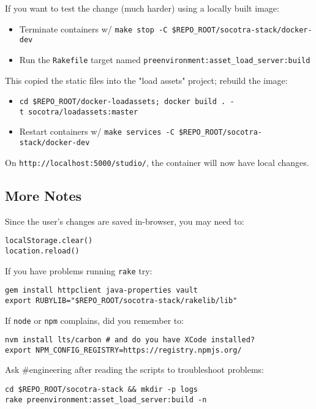 If you want to test the change (much harder) using a locally built
image:

\begin{itemize}
\tightlist
\item
  Terminate containers w/
  \texttt{make\ stop\ -C\ \$REPO\_ROOT/socotra-stack/docker-dev}
\item
  Run the \texttt{Rakefile} target named
  \texttt{preenvironment:asset\_load\_server:build}
\end{itemize}

This copied the static files into the "load assets" project; rebuild the
image:

\begin{itemize}
\tightlist
\item
  \texttt{cd\ \$REPO\_ROOT/docker-loadassets;\ docker\ build\ .\ -t\ socotra/loadassets:master}
\item
  Restart containers w/
  \texttt{make\ services\ -C\ \$REPO\_ROOT/socotra-stack/docker-dev}
\end{itemize}

On \texttt{http://localhost:5000/studio/}, the container will now have
local changes.

\hypertarget{more-notes}{%
\subsection{More Notes}\label{more-notes}}

Since the user's changes are saved in-browser, you may need to:

\begin{verbatim}
localStorage.clear()
location.reload()
\end{verbatim}

If you have problems running \texttt{rake} try:

\begin{verbatim}
gem install httpclient java-properties vault
export RUBYLIB="$REPO_ROOT/socotra-stack/rakelib/lib"
\end{verbatim}

If \texttt{node} or \texttt{npm} complains, did you remember to:

\begin{verbatim}
nvm install lts/carbon # and do you have XCode installed?
export NPM_CONFIG_REGISTRY=https://registry.npmjs.org/
\end{verbatim}

Ask \#engineering after reading the scripts to troubleshoot problems:

\begin{verbatim}
cd $REPO_ROOT/socotra-stack && mkdir -p logs
rake preenvironment:asset_load_server:build -n
\end{verbatim}
